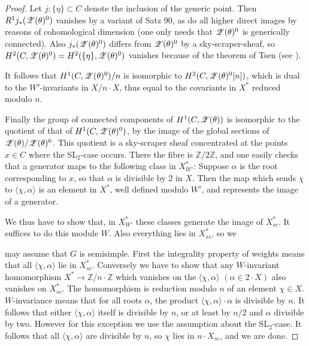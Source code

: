 \documentclass[12pt,english]{smfart}
\theoremstyle{plain} \newtheorem{innerthm}{Theorem} \newtheorem{innerlem}{Lemma} \newtheorem{innerprop}{Proposition} \newtheorem{innercor}{Corollary} \theoremstyle{definition} \newtheorem{innerdefn}{Definition} \newtheorem{innerconstr}{Construction} \theoremstyle{remark} \newtheorem*{remark}{Remark} \newtheorem*{remarks}{Remarks} \newtheorem*{applications}{Applications}
\begin{document}
\begin{proof}
Let $j\colon\{\eta\}\subset C$ denote the inclusion of the generic point. Then $R^1j_*(\mathscr{Z}(\theta)^0)$ vanishes by a variant of Satz 90, as do all higher direct images by reasons of cohomological dimension (one only needs that $\mathscr{Z}(\theta)^0$ is generically connected). Also $j_*(\mathscr{Z}(\theta)^0)$ differs from $\mathscr{Z}(\theta)^0$ by a sky-scraper-sheaf, so $H^2(C,\mathscr{Z}(\theta)^0)=H^2(\{\eta\},\mathscr{Z}(\theta)^0)$ vanishes because of the theorem of Tsen (see \cite{Se}).

It follows that $H^1(C,\mathscr{Z}(\theta)^0)/n$ is isomorphic to $H^2(C,\mathscr{Z}(\theta)^0[n])$, which is dual to the $W'$-invariants in $X/n\cdot X$, thus equal to the covariants in $X^*$ reduced modulo $n$.

Finally the group of connected components of $H^1(C,\mathscr{Z}(\theta))$ is isomorphic to the quotient of that of $H^1(C,\mathscr{Z}(\theta)^0)$, by the image of the global sections of $\mathscr{Z}(\theta)/\mathscr{Z}(\theta)^0$. This quotient is a sky-scraper sheaf concentrated at the points $x\in C$ where the SL$_2$-case occurs. There the fibre is $\mathbb{Z}/2\mathbb{Z}$, and one easily checks that a generator maps to the following class in $X^*_{W'}$: Suppose $\alpha$ is the root corresponding to $x$, so that $\alpha$ is divisible by $2$ in $X$. Then the map which sends $\chi$ to $\langle\chi,\alpha\rangle$ is an element in $X^*$, well defined modulo $W'$, and represents the image of a generator.

We thus have to show that, in $X^*_{W'}$ these classes generate the image of $X^*_{sc}$. It suffices to do this module $W$. Also everything lies in $X^*_{ss}$, so we


may assume that $G$ is semisimple. First the integrality property of weights means that all $\langle\chi,\alpha\rangle$ lie in $X^*_{sc}$. Conversely we have to show that any $W$-invariant homomorphism $X^*\to\mathbb{Z}/n\cdot\mathbb{Z}$ which vanishes on the $\langle\chi,\alpha\rangle$ $(\alpha\in 2\cdot X)$ also vanishes on $X^*_{sc}$. The homomorphism is reduction modulo $n$ of an element $\chi\in X$. $W$-invariance means that for all roots $\alpha$, the product $\langle\chi,\alpha\rangle\cdot\alpha$ is divisible by $n$. It follows that either $\langle\chi,\alpha\rangle$ itself is divisible by $n$, or at least by $n/2$ and $\alpha$ divisible by two. However for this exception we use the assumption about the SL$_2$-case. It follows that all $\langle\chi,\alpha\rangle$ are divisible by $n$, so $\chi$ lies in $n\cdot X_{sc}$, and we are done.


\end{proof}
\end{document}
